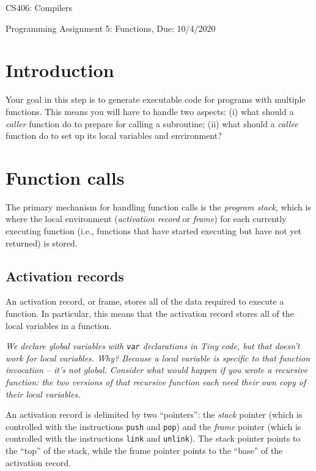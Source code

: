 \documentclass{article}
\begin{document}
\begin{center}{\LARGE CS406: Compilers} \end{center}
\begin{center}{\large Programming Assignment 5: Functions,  Due: 10/4/2020} \end{center}

\bigskip



\section{Introduction}
Your goal in this step is to generate executable code for programs with multiple functions.
This means you will have to handle two aspects: (i) what should a {\em caller} function do to prepare for calling a subroutine; (ii) what should a {\em callee} function do to set up its local variables and environment?

\section{Function calls}
The primary mechanism for handling function calls is the {\em program stack}, which is where the local environment ({\em activation record} or {\em frame}) for each currently executing function (i.e., functions that have started executing but have not yet returned) is stored. 

\subsection{Activation records}
An activation record, or frame, stores all of the data required to execute a function. In particular, this means that the activation record stores all of the local variables in a function.

{\em We declare global variables with \texttt{var} declarations in Tiny code, but that doesn't work for local variables. Why? Because a local variable is specific to {\em that} function invocation -- it's not global. Consider what would happen if you wrote a recursive function: the two versions of that recursive function each need their own copy of their local variables. }

An activation record is delimited by two ``pointers'': the {\em stack} pointer (which is controlled with the instructions \texttt{push} and \texttt{pop}) and the {\em frame} pointer (which is controlled with the instructions \texttt{link} and \texttt{unlink}). The stack pointer points to the ``top'' of the stack, while the frame pointer points to the ``base'' of the activation record.
\end{document}
